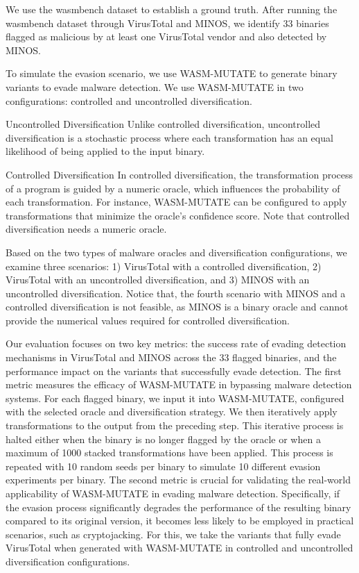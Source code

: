 We use the wasmbench dataset \cite{Hilbig2021AnES} to establish a ground truth. 
After running the wasmbench dataset through VirusTotal and MINOS, we identify 33 binaries flagged as malicious by at least one VirusTotal vendor and also detected by MINOS.

To simulate the evasion scenario, we use WASM-MUTATE to generate \Wasm binary variants to evade malware detection.
We use WASM-MUTATE in two configurations: controlled and uncontrolled diversification.

\begin{definition}{Uncontrolled Diversification}
    \label{uncontrolled_def}
    Unlike controlled diversification, uncontrolled diversification is a stochastic process where each transformation has an equal likelihood of being applied to the input \Wasm binary.
\end{definition}

\begin{definition}{Controlled Diversification}
    \label{controlled_def}
    In controlled diversification, the transformation process of a \Wasm program is guided by a numeric oracle, which influences the probability of each transformation. For instance, WASM-MUTATE can be configured to apply transformations that minimize the oracle's confidence score. Note that controlled diversification needs a numeric oracle.
\end{definition}


Based on the two types of malware oracles and diversification configurations, we examine three scenarios:
1) VirusTotal with a controlled diversification, 2) VirusTotal with an uncontrolled diversification, and 3) MINOS with an uncontrolled diversification.
Notice that, the fourth scenario with MINOS and a controlled diversification is not feasible, as MINOS is a binary oracle and cannot provide the numerical values required for controlled diversification.

Our evaluation focuses on two key metrics: the success rate of evading detection mechanisms in VirusTotal and MINOS across the 33 flagged binaries, and the performance impact on the variants that successfully evade detection.
The first metric measures the efficacy of WASM-MUTATE in bypassing malware detection systems. 
For each flagged binary, we input it into WASM-MUTATE, configured with the selected oracle and diversification strategy. 
We then iteratively apply transformations to the output from the preceding step. 
This iterative process is halted either when the binary is no longer flagged by the oracle or when a maximum of 1000 stacked transformations have been applied.
This process is repeated with 10 random seeds per binary to simulate 10 different evasion experiments per binary.
The second metric is crucial for validating the real-world applicability of WASM-MUTATE in evading malware detection. 
Specifically, if the evasion process significantly degrades the performance of the resulting binary compared to its original version, it becomes less likely to be employed in practical scenarios, such as cryptojacking.
For this, we take the variants that fully evade VirusTotal when generated with WASM-MUTATE in controlled and uncontrolled diversification configurations.

